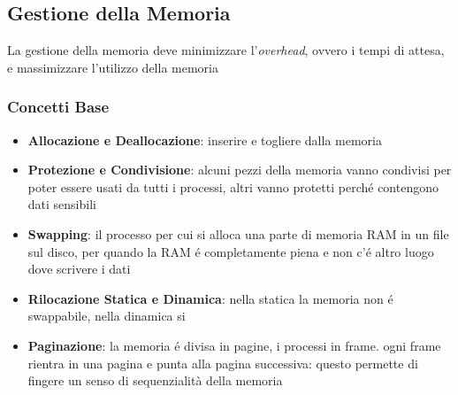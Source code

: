 \documentclass{article}
\begin{document}
{

  \subsection{Gestione della Memoria}
  La gestione della memoria deve minimizzare l'\textit{overhead}, ovvero i tempi di attesa, e massimizzare l'utilizzo della memoria

  \subsubsection{Concetti Base} %
  \begin{itemize}
    \item \textbf{Allocazione e Deallocazione}: inserire e togliere dalla memoria
    \item \textbf{Protezione e Condivisione}: alcuni pezzi della memoria vanno condivisi per poter essere usati da tutti i processi, altri vanno protetti perché contengono dati sensibili
    \item \textbf{Swapping}: il processo per cui si alloca una parte di memoria RAM in un file sul disco, per quando la RAM é completamente piena e non c'é altro luogo dove scrivere i dati
    \item \textbf{Rilocazione Statica e Dinamica}: nella statica la memoria non é swappabile, nella dinamica si
    \item \textbf{Paginazione}: la memoria é divisa in pagine, i processi in frame. ogni frame rientra in una pagina e punta alla pagina successiva: questo permette di fingere un senso di sequenzialità della memoria
  \end{itemize}

}
\end{document}

